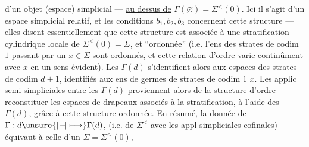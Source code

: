 d'un objet (espace) simplicial --- \uline{au dessus de}
$\Gamma(\varnothing)=\Sigma^{<}(0)$. Ici il s'agit d'un espace
simplicial relatif, et les conditions $b_1,b_2,b_3$
concernent cette structure --- elles disent
essentiellement que cette structure est associée
à une stratification cylindrique locale de
$\Sigma^{<}(0)=\Sigma$, et ``ordonnée'' (i.e. l'ens des
strates de codim $1$ passant par un $x\in\Sigma$ sont
 ordonnés, et cette relation d'ordre varie
continûment avec $x$ en un sens évident).
Les  $\Gamma(d)$ s'identifient alors
aux  espaces des  strates de codim
$d+1$,   identifiés  aux ens de germes de strates
de codim $1$   \unsure{$=$|$\ni$} $x$. Les applic
semi-simpliciales entre les $\Gamma(d)$ proviennent
alors de la structure d'ordre --- 
 reconstituer les espaces de drapeaux
associés à la stratification, à l'aide des
 $\Gamma(d)$, grâce à cette structure ordonnée.
En résumé, la donnée de $\Gamma:d\unsure{\mid\! -\!|\longmapsto}\Gamma(d)$,
 (i.e. de $\Sigma^{<}$ avec les appl  simpliciales
cofinales) équivaut à celle d'un $\Sigma=\Sigma^{<}(0)$,
